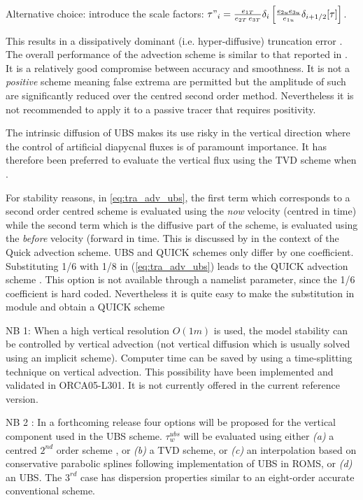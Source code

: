 \documentclass[../tex_main/NEMO_manual]{subfiles}
\begin{document}
Alternative choice: introduce the scale factors:  
$\tau "_i =\frac{e_{1T}}{e_{2T}\,e_{3T}}\delta _i \left[ \frac{e_{2u} e_{3u} }{e_{1u} }\delta _{i+1/2}[\tau] \right]$.


This results in a dissipatively dominant (i.e. hyper-diffusive) truncation 
error \citep{Shchepetkin_McWilliams_OM05}. The overall performance of the 
advection scheme is similar to that reported in \cite{Farrow1995}. 
It is a relatively good compromise between accuracy and smoothness. It is 
not a \emph{positive} scheme meaning false extrema are permitted but the 
amplitude of such are significantly reduced over the centred second order 
method. Nevertheless it is not recommended to apply it to a passive tracer 
that requires positivity. 

The intrinsic diffusion of UBS makes its use risky in the vertical direction 
where the control of artificial diapycnal fluxes is of paramount importance. 
It has therefore been preferred to evaluate the vertical flux using the TVD 
scheme when .

For stability reasons, in \autoref{eq:tra_adv_ubs}, the first term which corresponds 
to a second order centred scheme is evaluated using the \textit{now} velocity 
(centred in time) while the second term which is the diffusive part of the scheme, 
is evaluated using the \textit{before} velocity (forward in time. This is discussed 
by \citet{Webb_al_JAOT98} in the context of the Quick advection scheme. UBS and QUICK 
schemes only differ by one coefficient. Substituting 1/6 with 1/8 in 
(\autoref{eq:tra_adv_ubs}) leads to the QUICK advection scheme \citep{Webb_al_JAOT98}. 
This option is not available through a namelist parameter, since the 1/6 
coefficient is hard coded. Nevertheless it is quite easy to make the 
substitution in  module and obtain a QUICK scheme

NB 1: When a high vertical resolution $O(1m)$ is used, the model stability can 
be controlled by vertical advection (not vertical diffusion which is usually 
solved using an implicit scheme). Computer time can be saved by using a 
time-splitting technique on vertical advection. This possibility have been 
implemented and validated in ORCA05-L301. It is not currently offered in the 
current reference version. 

NB 2 : In a forthcoming release four options will be proposed for the 
vertical component used in the UBS scheme. $\tau _w^{ubs}$ will be 
evaluated using either \textit{(a)} a centred $2^{nd}$ order scheme , 
or  \textit{(b)} a TVD scheme, or  \textit{(c)} an interpolation based on conservative 
parabolic splines following \citet{Shchepetkin_McWilliams_OM05} implementation of UBS in ROMS, 
or  \textit{(d)} an UBS. The $3^{rd}$ case has dispersion properties similar to an 
eight-order accurate conventional scheme.
\end{document}
